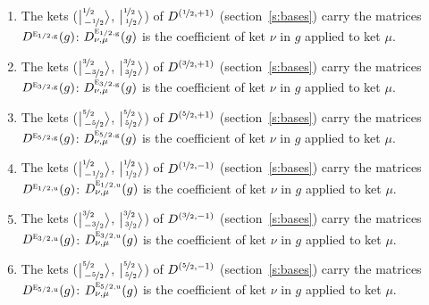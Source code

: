 \documentclass[10pt,a4paper]{article}
\numberwithin{equation}{section}
\newcommand{\irr}[1]{\text{\normalfont\scshape #1}}
\newcommand{\ptag}[1]{\mathrm{#1}}
\newcommand{\irrJp}[2]{D^{(#1,#2)}}
\newcommand{\repD}[1]{D^{#1}}
\newcommand{\intx}{\mu}
\newcommand{\jm}[2]{\bigl\lvert{}^{#1}_{\,#2}\bigr\rangle}
\newenvironment{romanlist}{\begin{enumerate}%
\renewcommand{\labelenumi}{(\roman{enumi})}}%
  {\end{enumerate}}
\begin{document}
\begin{romanlist}\raggedright
\item The kets ($\jm{\nicefrac{1}{2}}{-\nicefrac{1}{2}}$, $\jm{\nicefrac{1}{2}}{\nicefrac{1}{2}}$) of $\irrJp{\nicefrac{1}{2}}{+1}$ (section~\ref{s:bases}) carry the matrices $\repD{\irr{e}_{1/2,\ptag{g}}}(g)$: $\repD{\irr{e}_{1/2,\ptag{g}}}_{\nu,\intx}(g)$ is the coefficient of ket $\nu$ in $g$ applied to ket $\intx$.
\item The kets ($\jm{\nicefrac{3}{2}}{-\nicefrac{3}{2}}$, $\jm{\nicefrac{3}{2}}{\nicefrac{3}{2}}$) of $\irrJp{\nicefrac{3}{2}}{+1}$ (section~\ref{s:bases}) carry the matrices $\repD{\irr{e}_{3/2,\ptag{g}}}(g)$: $\repD{\irr{e}_{3/2,\ptag{g}}}_{\nu,\intx}(g)$ is the coefficient of ket $\nu$ in $g$ applied to ket $\intx$.
\item The kets ($\jm{\nicefrac{5}{2}}{-\nicefrac{5}{2}}$, $\jm{\nicefrac{5}{2}}{\nicefrac{5}{2}}$) of $\irrJp{\nicefrac{5}{2}}{+1}$ (section~\ref{s:bases}) carry the matrices $\repD{\irr{e}_{5/2,\ptag{g}}}(g)$: $\repD{\irr{e}_{5/2,\ptag{g}}}_{\nu,\intx}(g)$ is the coefficient of ket $\nu$ in $g$ applied to ket $\intx$.
\item The kets ($\jm{\nicefrac{1}{2}}{-\nicefrac{1}{2}}$, $\jm{\nicefrac{1}{2}}{\nicefrac{1}{2}}$) of $\irrJp{\nicefrac{1}{2}}{-1}$ (section~\ref{s:bases}) carry the matrices $\repD{\irr{e}_{1/2,\ptag{u}}}(g)$: $\repD{\irr{e}_{1/2,\ptag{u}}}_{\nu,\intx}(g)$ is the coefficient of ket $\nu$ in $g$ applied to ket $\intx$.
\item The kets ($\jm{\nicefrac{3}{2}}{-\nicefrac{3}{2}}$, $\jm{\nicefrac{3}{2}}{\nicefrac{3}{2}}$) of $\irrJp{\nicefrac{3}{2}}{-1}$ (section~\ref{s:bases}) carry the matrices $\repD{\irr{e}_{3/2,\ptag{u}}}(g)$: $\repD{\irr{e}_{3/2,\ptag{u}}}_{\nu,\intx}(g)$ is the coefficient of ket $\nu$ in $g$ applied to ket $\intx$.
\item The kets ($\jm{\nicefrac{5}{2}}{-\nicefrac{5}{2}}$, $\jm{\nicefrac{5}{2}}{\nicefrac{5}{2}}$) of $\irrJp{\nicefrac{5}{2}}{-1}$ (section~\ref{s:bases}) carry the matrices $\repD{\irr{e}_{5/2,\ptag{u}}}(g)$: $\repD{\irr{e}_{5/2,\ptag{u}}}_{\nu,\intx}(g)$ is the coefficient of ket $\nu$ in $g$ applied to ket $\intx$.
\end{romanlist}
\end{document}

